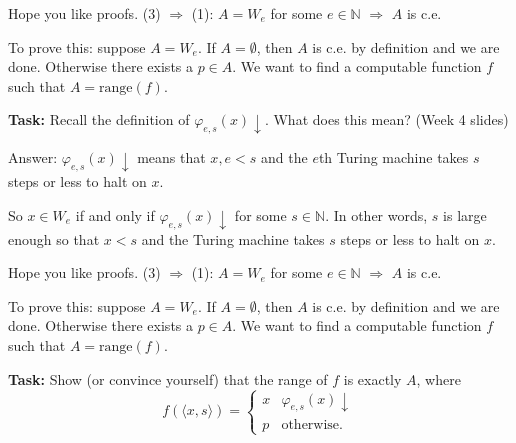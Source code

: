 \documentclass{beamer}
\begin{document}
\begin{frame}{Hope you like proofs.}
(3) $\Rightarrow$ (1): $A = W_e$ for some $e \in \mathbb N$ $\Rightarrow$ $A$ is c.e.

\vspace{2mm}

To prove this: suppose $A = W_e$. If $A = \emptyset$, then $A$ is c.e. by definition and we are done. Otherwise there exists a $p \in A$. We want to find a computable function $f$ such that $A = \text{range}(f)$.

\vspace{2mm}

\textbf{Task:} Recall the definition of $\varphi_{e, s}(x) \downarrow$. What does this mean? (Week 4 slides)

Answer: $\varphi_{e, s}(x) \downarrow$ means that $x, e < s$ and the $e$th Turing machine takes $s$ steps or less to halt on $x$.

\vspace{2mm}

So $x \in W_e$ if and only if $\varphi_{e, s}(x) \downarrow$ for some $s \in \mathbb N$. In other words, $s$ is large enough so that $x < s$ and the Turing machine takes $s$ steps or less to halt on $x$.
\end{frame}

\begin{frame}{Hope you like proofs.}
(3) $\Rightarrow$ (1): $A = W_e$ for some $e \in \mathbb N$ $\Rightarrow$ $A$ is c.e.

\vspace{2mm}

To prove this: suppose $A = W_e$. If $A = \emptyset$, then $A$ is c.e. by definition and we are done. Otherwise there exists a $p \in A$. We want to find a computable function $f$ such that $A = \text{range}(f)$.

\vspace{2mm}

\textbf{Task:} Show (or convince yourself) that the range of $f$ is exactly $A$, where
$$f(\langle x, s\rangle) = \begin{cases}
x & \varphi_{e, s}(x) \downarrow\\
p & \text{otherwise.}
\end{cases}$$
\end{frame}
\end{document}
